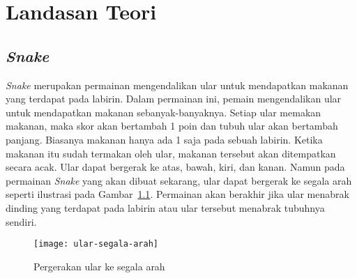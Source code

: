 \chapter{Landasan Teori}
\label{chap:teori}



\section{\textit{Snake}}
\label{sec:snake}
\textit{Snake} merupakan permainan mengendalikan ular untuk mendapatkan makanan yang terdapat pada labirin. Dalam permainan ini, pemain mengendalikan ular untuk mendapatkan makanan sebanyak-banyaknya. Setiap ular memakan makanan, maka skor akan bertambah 1 poin dan tubuh ular akan bertambah panjang. Biasanya makanan hanya ada 1 saja pada sebuah labirin. Ketika makanan itu sudah termakan oleh ular, makanan tersebut akan ditempatkan secara acak. Ular dapat bergerak ke atas, bawah, kiri, dan kanan. Namun pada permainan \textit{Snake} yang akan dibuat sekarang, ular dapat bergerak ke segala arah seperti ilustrasi pada Gambar~\ref{fig:ularSegalaArah}. Permainan akan berakhir jika ular menabrak dinding yang terdapat pada labirin atau ular tersebut menabrak tubuhnya sendiri. \\

\begin{figure}[H]
	\centering  
	\texttt{[image: ular-segala-arah]}  
	\caption[Pergerakan ular ke segala arah]{Pergerakan ular ke segala arah} 
	\label{fig:ularSegalaArah} 
\end{figure} 

